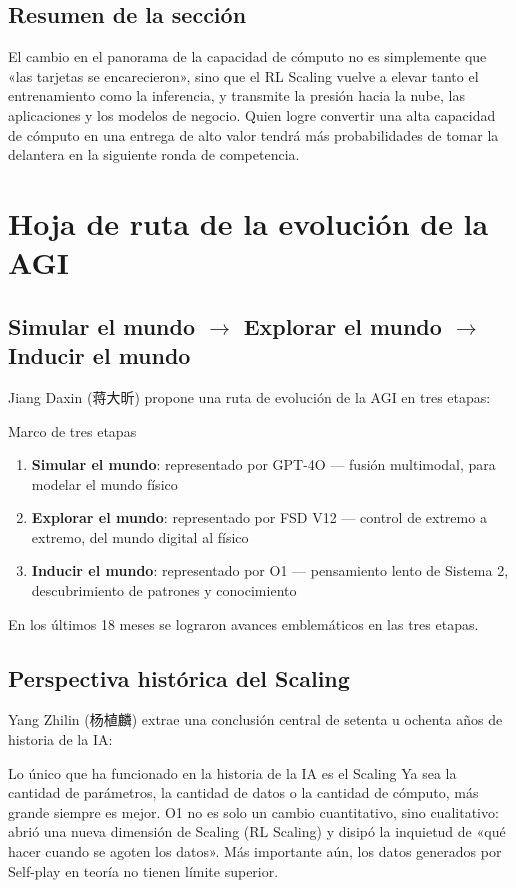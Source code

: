 \documentclass[a4paper]{article}
\begin{document}
\subsection{Resumen de la sección}
El cambio en el panorama de la capacidad de cómputo no es simplemente que «las tarjetas se encarecieron», sino que el RL Scaling vuelve a elevar tanto el entrenamiento como la inferencia, y transmite la presión hacia la nube, las aplicaciones y los modelos de negocio. Quien logre convertir una alta capacidad de cómputo en una entrega de alto valor tendrá más probabilidades de tomar la delantera en la siguiente ronda de competencia.

\section{Hoja de ruta de la evolución de la AGI}

\subsection{Simular el mundo $\rightarrow$ Explorar el mundo $\rightarrow$ Inducir el mundo}

Jiang Daxin (蒋大昕) propone una ruta de evolución de la AGI en tres etapas:

\begin{knowledgebox}{Marco de tres etapas}
\begin{enumerate}
\item \textbf{Simular el mundo}: representado por GPT-4O — fusión multimodal, para modelar el mundo físico
\item \textbf{Explorar el mundo}: representado por FSD V12 — control de extremo a extremo, del mundo digital al físico
\item \textbf{Inducir el mundo}: representado por O1 — pensamiento lento de Sistema 2, descubrimiento de patrones y conocimiento
\end{enumerate}
En los últimos 18 meses se lograron avances emblemáticos en las tres etapas.
\end{knowledgebox}

\subsection{Perspectiva histórica del Scaling}

Yang Zhilin (杨植麟) extrae una conclusión central de setenta u ochenta años de historia de la IA:

\begin{importantbox}{Lo único que ha funcionado en la historia de la IA es el Scaling}
Ya sea la cantidad de parámetros, la cantidad de datos o la cantidad de cómputo, más grande siempre es mejor. O1 no es solo un cambio cuantitativo, sino cualitativo: abrió una nueva dimensión de Scaling (RL Scaling) y disipó la inquietud de «qué hacer cuando se agoten los datos». Más importante aún, los datos generados por Self-play en teoría no tienen límite superior.
\end{importantbox}
\end{document}

